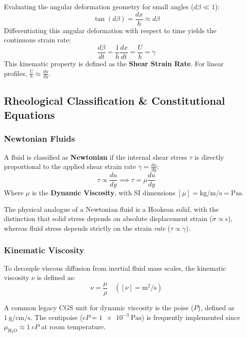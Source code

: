 Evaluating the angular deformation geometry for small angles ($d\beta \ll 1$):
\begin{equation}
    \tan(d\beta) = \frac{dx}{h} \approx d\beta
\end{equation}
Differentiating this angular deformation with respect to time yields the continuous strain rate:
\begin{equation}
    \frac{d\beta}{dt} = \frac{1}{h}\frac{dx}{dt} = \frac{U}{h} = \dot{\gamma}
\end{equation}
This kinematic property is defined as the \textbf{Shear Strain Rate}. For linear profiles, $\frac{U}{h} \approx \frac{du}{dy}$.

\subsection{Rheological Classification \& Constitutional Equations}

\subsubsection{Newtonian Fluids}
A fluid is classified as \textbf{Newtonian} if the internal shear stress $\tau$ is directly proportional to the applied shear strain rate $\dot{\gamma} = \frac{du}{dy}$:
\begin{equation}
    \tau \propto \frac{du}{dy} \implies \tau = \mu \frac{du}{dy}
    \label{eq:newtonian}
\end{equation}
Where $\mu$ is the \textbf{Dynamic Viscosity}, with SI dimensions $[\mu] = \si{\kilogram\per\meter\per\second} = \si{\pascal\second}$.

The physical analogue of a Newtonian fluid is a Hookean solid, with the distinction that solid stress depends on absolute displacement strain ($\sigma \propto \epsilon$), whereas fluid stress depends strictly on the strain \textit{rate} ($\tau \propto \dot{\gamma}$).

\subsubsection{Kinematic Viscosity}
To decouple viscous diffusion from inertial fluid mass scales, the kinematic viscosity $\nu$ is defined as:
\begin{equation}
    \nu = \frac{\mu}{\rho} \quad \left([\nu] = \si{\square\meter\per\second}\right)
\end{equation}

\begin{notebox}
A common legacy CGS unit for dynamic viscosity is the poise ($\si{P}$), defined as $\SI{1}{\gram\per\centi\meter\per\second}$. The centipoise ($\si{cP} = \SI{1e-3}{\pascal\second}$) is frequently implemented since $\mu_{\text{H}_2\text{O}} \approx \SI{1}{cP}$ at room temperature.
\end{notebox}

